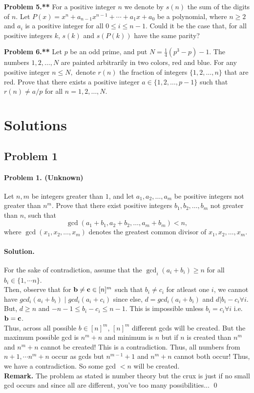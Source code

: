\documentclass[12pt]{article}
\newenvironment{solution}
{\paragraph{Solution.}}
{\qed\eject}
\begin{document}
\textbf{Problem 5.**} For a positive integer $n$ we denote by $s(n)$ the sum of the digits of $n$. Let $P(x)=x^n+a_{n-1}x^{n-1}+\cdots+a_1x+a_0$ be a polynomial, where $n \geqslant 2$ and $a_i$ is a positive integer for all $0 \leqslant i \leqslant n-1$. Could it be the case that, for all positive integers $k$, $s(k)$ and $s(P(k))$ have the same parity?

\textbf{Problem 6.**} Let $p$ be an odd prime, and put $N=\frac{1}{4} (p^3 -p) -1.$ The numbers $1,2, \dots, N$ are painted arbitrarily in two colors, red and blue. For any positive integer $n \leqslant N,$ denote $r(n)$ the fraction of integers $\{ 1,2, \dots, n \}$ that are red.
Prove that there exists a positive integer $a \in \{ 1,2, \dots, p-1\}$ such that $r(n) \neq a/p$ for all $n = 1,2, \dots , N.$

\section*{Solutions}

\subsection*{Problem 1}

\paragraph*{\textbf{Problem 1. (Unknown)}} Let $n, m$ be integers greater than $1$, and let $a_1, a_2, \dots, a_m$ be positive integers not greater than $n^m$. Prove that there exist positive integers $b_1, b_2, \dots, b_m$ not greater than $n$, such that\[ \gcd(a_1 + b_1, a_2 + b_2, \dots, a_m + b_m) < n, \]where $\gcd(x_1, x_2, \dots, x_m)$ denotes the greatest common divisor of $x_1, x_2, \dots, x_m$.

\begin{solution}
    For the sake of contradiction, assume that the $\gcd_{i}(a_i+b_i)\ge n$ for all $b_i\in \{1,\cdots n\}$.\\

    Then, observe that for ${\bf b\ne c}\in [n]^m$ such that $b_i\ne c_i$ for atleast one $i$, we cannot have $gcd_i(a_i+b_i)\mid gcd_i(a_i+c_i)$ since else, $d=gcd_i(a_i+b_i)$ and $d|b_i-c_i\forall i$. But, $d\ge n$ and $-n-1\le b_i-c_i\le n-1$. This is impossible unless $b_i=c_i\forall i$ i.e. ${\bf b=c}$. \\
    
    Thus, across all possible $b\in [n]^m$, $[n]^m$ different gcds will be created. But the maximum possible gcd is $n^m+n$ and minimum is $n$ but if $n$ is created than $n^m$ and $n^m+n$ cannot be created! This is a contradiction. Thus, all numbers from $n+1,\cdots n^m+n$ occur as gcds but $n^{m-1}+1$ and $n^m+n$ cannot both occur! Thus, we have a contradiction. So some gcd $<n$ will be created.\\

    \textbf{Remark.} The problem as stated is number theory but the crux is just if no small gcd occurs and since all are different, you've too many possibilities...
\end{solution}
\end{document}
